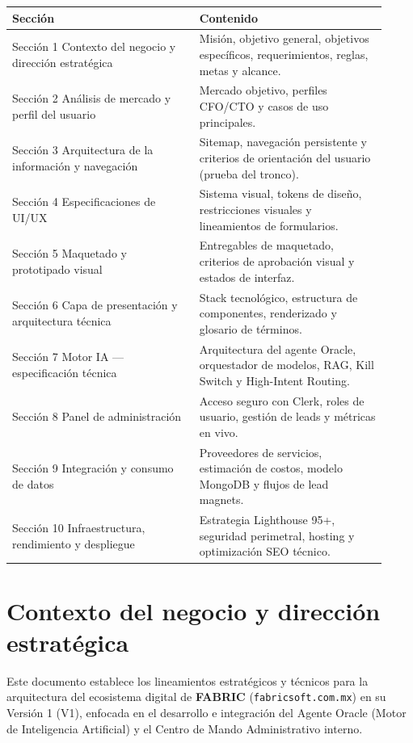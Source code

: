 \documentclass[11pt,letterpaper]{article}
\begin{document}
\begin{longtable}{p{0.46\linewidth}p{0.46\linewidth}}
\toprule
\textbf{Sección} & \textbf{Contenido} \\
\midrule
Sección 1 Contexto del negocio y dirección estratégica & Misión, objetivo general, objetivos específicos, requerimientos, reglas, metas y alcance. \\
Sección 2 Análisis de mercado y perfil del usuario & Mercado objetivo, perfiles CFO/CTO y casos de uso principales. \\
Sección 3 Arquitectura de la información y navegación & Sitemap, navegación persistente y criterios de orientación del usuario (prueba del tronco). \\
Sección 4 Especificaciones de UI/UX & Sistema visual, tokens de diseño, restricciones visuales y lineamientos de formularios. \\
Sección 5 Maquetado y prototipado visual & Entregables de maquetado, criterios de aprobación visual y estados de interfaz. \\
Sección 6 Capa de presentación y arquitectura técnica & Stack tecnológico, estructura de componentes, renderizado y glosario de términos. \\
Sección 7 Motor IA — especificación técnica & Arquitectura del agente Oracle, orquestador de modelos, RAG, Kill Switch y High-Intent Routing. \\
Sección 8 Panel de administración & Acceso seguro con Clerk, roles de usuario, gestión de leads y métricas en vivo. \\
Sección 9 Integración y consumo de datos & Proveedores de servicios, estimación de costos, modelo MongoDB y flujos de lead magnets. \\
Sección 10 Infraestructura, rendimiento y despliegue & Estrategia Lighthouse 95+, seguridad perimetral, hosting y optimización SEO técnico. \\
\bottomrule
\end{longtable}

\section{Contexto del negocio y dirección estratégica}

Este documento establece los lineamientos estratégicos y técnicos para la arquitectura del ecosistema digital de \textbf{FABRIC} (\texttt{fabricsoft.com.mx}) en su Versión 1 (V1), enfocada en el desarrollo e integración del Agente Oracle (Motor de Inteligencia Artificial) y el Centro de Mando Administrativo interno.
\end{document}
